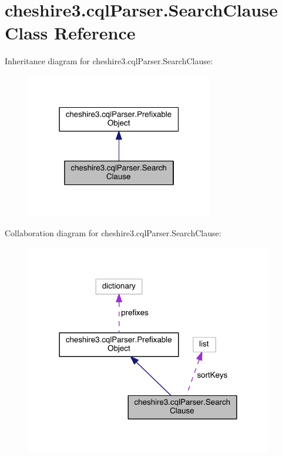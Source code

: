 \hypertarget{classcheshire3_1_1cql_parser_1_1_search_clause}{\section{cheshire3.\-cql\-Parser.\-Search\-Clause Class Reference}
\label{classcheshire3_1_1cql_parser_1_1_search_clause}
}


Inheritance diagram for cheshire3.\-cql\-Parser.\-Search\-Clause\-:
\nopagebreak
\begin{figure}[H]
\begin{center}
\leavevmode
\includegraphics[width=232pt]{classcheshire3_1_1cql_parser_1_1_search_clause__inherit__graph}
\end{center}
\end{figure}


Collaboration diagram for cheshire3.\-cql\-Parser.\-Search\-Clause\-:
\nopagebreak
\begin{figure}[H]
\begin{center}
\leavevmode
\includegraphics[width=306pt]{classcheshire3_1_1cql_parser_1_1_search_clause__coll__graph}
\end{center}
\end{figure}

